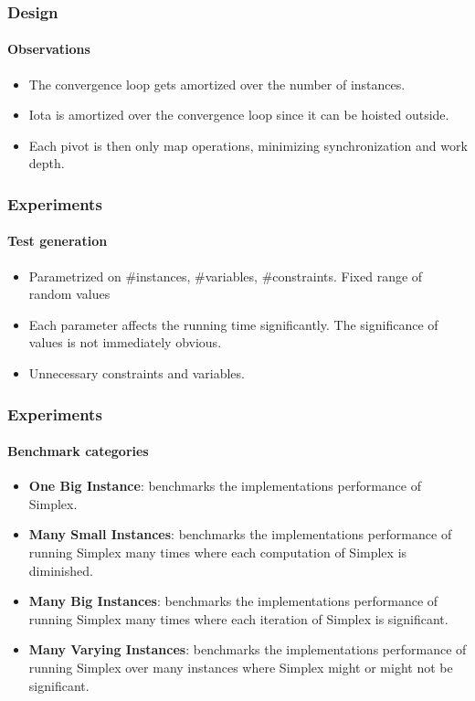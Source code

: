 \documentclass{beamer}
\begin{document}
\begin{frame}
\frametitle{Design}
\framesubtitle{Observations}
\begin{itemize}
	\item The convergence loop gets amortized over the number of instances.
	
	\item Iota is amortized over the convergence loop since it can be hoisted outside.
	
	\item Each pivot is then only map operations, minimizing synchronization and work depth.
\end{itemize}
\end{frame}


\begin{frame}
	\frametitle{Experiments}
	\framesubtitle{Test generation}
	\begin{itemize}
		\item Parametrized on \#instances, \#variables, \#constraints. Fixed range of random values
		
		\item Each parameter affects the running time significantly. The significance of values is not immediately obvious.
		
		\item Unnecessary constraints and variables.
	\end{itemize}
\end{frame}

\begin{frame}
\frametitle{Experiments}
\framesubtitle{Benchmark categories}
\begin{itemize}
	\item \textbf{One Big Instance}: benchmarks the implementations performance of Simplex.
	
	\item \textbf{Many Small Instances}: benchmarks the implementations performance of running Simplex many times where each computation of Simplex is diminished.
	
	\item \textbf{Many Big Instances}: benchmarks the implementations performance of running Simplex many times where each iteration of Simplex is significant.
	
	\item \textbf{Many Varying Instances}: benchmarks the implementations performance of running Simplex over many instances where Simplex might or might not be significant.
\end{itemize}
\end{frame}
\end{document}
